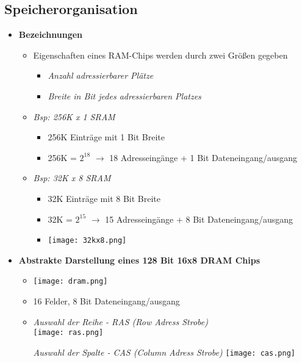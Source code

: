 \subsection{Speicherorganisation}
    \begin{itemize}
        \item \textbf{Bezeichnungen}
            \begin{itemize}
                \item Eigenschaften eines RAM-Chips werden durch zwei Grö\ss en gegeben
                    \begin{itemize}
                        \item \textit{Anzahl adressierbarer Plätze}
                        \item \textit{Breite in Bit jedes adressierbaren Platzes}
                    \end{itemize}
                \item \textit{Bsp: 256K x 1 SRAM}
                    \begin{itemize}
                        \item 256K Einträge mit 1 Bit Breite
                        \item 256K = $2^{18}$ $\rightarrow$ 18 Adresseingänge + 1 Bit Dateneingang/ausgang
                    \end{itemize}
                \item \textit{Bsp: 32K x 8 SRAM}
                    \begin{itemize}
                        \item 32K Einträge mit 8 Bit Breite
                        \item 32K = $2^{15}$ $\rightarrow$ 15 Adresseingänge + 8 Bit Dateneingang/ausgang
                        \item[] \texttt{[image: 32kx8.png]}
                    \end{itemize}
            \end{itemize}

\pagebreak

        \item \textbf{Abstrakte Darstellung eines 128 Bit 16x8 DRAM Chips}
            \begin{itemize}
                \item[] \texttt{[image: dram.png]}
                \item[] 16 Felder, 8 Bit Dateneingang/ausgang 
                \item[]
                    \begin{minipage}{0.45\textwidth}
                        \textit{Auswahl der Reihe - RAS (Row Adress Strobe)} \\
                        \texttt{[image: ras.png]}
                    \end{minipage}
                    \begin{minipage}{0.45\textwidth}
                        \textit{Auswahl der Spalte - CAS (Column Adress Strobe)}
                        \texttt{[image: cas.png]}
                    \end{minipage}
            \end{itemize}


\end{itemize}
